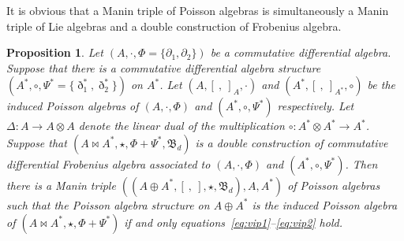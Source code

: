 \documentclass[pdftex]{sigma}
\numberwithin{equation}{section}
\newtheorem{Proposition}[Theorem]{Proposition}
{ \theoremstyle{definition}
	\newtheorem{Definition}[Theorem]{Definition}
	\newtheorem{Note}[Theorem]{Note}
	\newtheorem{Example}[Theorem]{Example}
	\newtheorem{Remark}[Theorem]{Remark} }
\begin{document}
\begin{Remark}It is obvious that a Manin triple of Poisson algebras is simultaneously a Manin triple of Lie algebras \cite{chari1995guide} and a double construction of Frobenius algebra.
\end{Remark}

\begin{Proposition}\label{pro:assFro}
 Let $(A, \cdot, \Phi = \{\partial_1, \partial_2\})$ be a commutative differential algebra.
 Suppose that there is a commutative differential algebra structure $(A^*, \circ, \Psi^*= \{\eth_1^*,\eth_2^*\})$ on $A^*$.
 Let $(A, [\ ,\ ]_A, \cdot)$ and $(A^*, [\ ,\ ]_{A^*}, \circ)$ be the induced Poisson algebras of $(A, \cdot, \Phi)$ and $(A^*, \circ, \Psi^*)$ respectively.
 Let $\Delta\colon A \to A \otimes A$ denote the linear dual of the multiplication $\circ\colon A^* \otimes A^* \to A^*$.
 Suppose that $(A \bowtie A^*, \star, \Phi + \Psi^*, \mathfrak{B}_d)$ is a double construction of commutative differential Frobenius algebra associated to $(A, \cdot, \Phi)$ and $(A^*, \circ, \Psi^*)$.
 Then there is a Manin triple $((A \oplus A^*,[\ ,\ ], \star, \mathfrak{B}_d), A, A^*)$ of Poisson algebras
 such that the Poisson algebra structure on $A \oplus A^*$ is the induced Poisson algebra of $(A \bowtie A^*, \star, \Phi + \Psi^*)$
 if and only equations~\eqref{eq:vip1}--\eqref{eq:vip2} hold.
 \end{Proposition}
\end{document}
